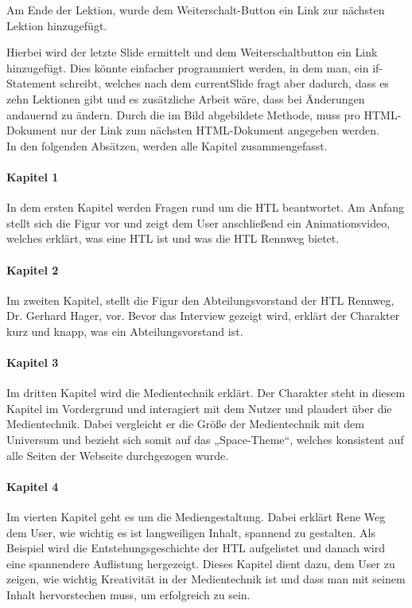 Am Ende der Lektion, wurde dem Weiterschalt-Button ein Link zur nächsten Lektion hinzugefügt. 

Hierbei wird der letzte Slide ermittelt und dem Weiterschaltbutton ein Link hinzugefügt. Dies könnte einfacher programmiert werden, in dem man, ein if-Statement schreibt, welches nach dem currentSlide fragt aber dadurch, dass es zehn Lektionen gibt und es zusätzliche Arbeit wäre, dass bei Änderungen andauernd zu ändern. Durch die im Bild abgebildete Methode, muss pro HTML-Dokument nur der Link zum nächsten HTML-Dokument angegeben werden. \\
In den folgenden Absätzen, werden alle Kapitel zusammengefasst.

\paragraph{Kapitel 1}
In dem ersten Kapitel werden Fragen rund um die HTL beantwortet. Am Anfang stellt sich die Figur vor und zeigt dem User anschließend ein Animationsvideo, welches erklärt, was eine HTL ist und was die HTL Rennweg bietet.
\paragraph{Kapitel 2}
Im zweiten Kapitel, stellt die Figur den Abteilungsvorstand der HTL Rennweg, Dr. Gerhard Hager, vor. Bevor das Interview gezeigt wird, erklärt der Charakter kurz und knapp, was ein Abteilungsvorstand ist.
\paragraph{Kapitel 3}
Im dritten Kapitel wird die Medientechnik erklärt. Der Charakter steht in diesem Kapitel im Vordergrund und interagiert mit dem Nutzer und plaudert über die Medientechnik. Dabei vergleicht er die Größe der Medientechnik mit dem Universum und bezieht sich somit auf das „Space-Theme“, welches konsistent auf alle Seiten der Webseite durchgezogen wurde. 
\paragraph{Kapitel 4}
Im vierten Kapitel geht es um die Mediengestaltung. Dabei erklärt Rene Weg dem User, wie wichtig es ist langweiligen Inhalt, spannend zu gestalten. Als Beispiel wird die Entstehungsgeschichte der HTL aufgelistet und danach wird eine spannendere Auflistung hergezeigt. Dieses Kapitel dient dazu, dem User zu zeigen, wie wichtig Kreativität in der Medientechnik ist und dass man mit seinem Inhalt hervorstechen muss, um erfolgreich zu sein.
